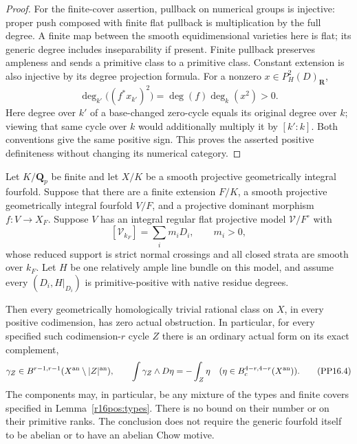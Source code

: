 \begin{proof}
For the finite-cover assertion, pullback on numerical groups
is injective: proper push composed with finite flat pullback
is multiplication by the full degree. A finite map between the
smooth equidimensional varieties here is flat; its generic
degree includes inseparability if present. Finite pullback
preserves ampleness and sends a primitive class to a primitive
class. Constant extension is also injective by its degree
projection formula. For a nonzero $x\in P_H^2(D)_{\mathbf R}$,
\[
  \deg_{k'}\bigl((f^*x_{k'})^2\bigr)
       =\deg(f)\deg_k(x^2)>0.
 \tag{PP16.2}\label{r16pos:finite-degree}
\]
Here degree over $k'$ of a base-changed zero-cycle equals its
original degree over $k$; viewing that same cycle over $k$
would additionally multiply it by $[k':k]$. Both conventions
give the same positive sign. This proves the asserted
positive definiteness without changing its numerical category.
\end{proof}

\begin{theorem}
\label{r16pos:local}
Let $K/\mathbf Q_p$ be finite and let $X/K$ be a smooth projective
geometrically integral fourfold. Suppose that there are a finite
extension $F/K$, a smooth projective geometrically integral
fourfold $V/F$, and a projective dominant morphism
$f:V\to X_F$. Suppose $V$ has an integral regular flat projective
model $\mathcal V/F^\circ$ with
\[
             [\mathcal V_{k_F}]=\sum_i m_iD_i,\qquad m_i>0,
 \tag{PP16.3}\label{r16pos:model}
\]
whose reduced support is strict normal crossings and all closed
strata are smooth over $k_F$. Let $H$ be one relatively ample
line bundle on this model, and assume every $(D_i,H|_{D_i})$
is primitive-positive with native residue degrees.

Then every geometrically homologically trivial rational class
on $X$, in every positive codimension, has zero actual obstruction.
In particular, for every specified such codimension-$r$ cycle $Z$
there is an ordinary actual form on its exact complement,
\[
 \gamma_Z\in B^{r-1,r-1}(X^{\rm an}\setminus|Z|^{\rm an}),
 \qquad
 \int\gamma_Z\wedge D\eta=-\int_Z\eta
 \quad(\eta\in B_c^{4-r,4-r}(X^{\rm an})).
 \tag{PP16.4}\label{r16pos:G}
\]
The components may, in particular, be any mixture of the types
and finite covers specified in Lemma~\ref{r16pos:types}.
There is no bound on their number or on their primitive ranks.
The conclusion does not require the generic fourfold itself
to be abelian or to have an abelian Chow motive.
\end{theorem}

